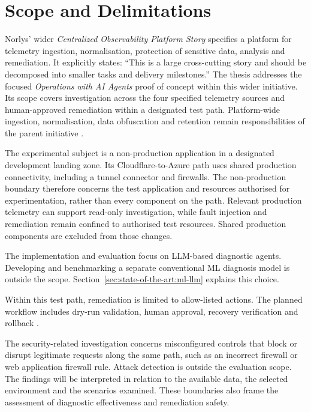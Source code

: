 \section{Scope and Delimitations}
\label{sec:introduction:scope}

Norlys' wider \emph{Centralized Observability Platform Story} specifies a
platform for telemetry ingestion, normalisation, protection of sensitive data,
analysis and remediation. It explicitly states:
\enquote{This is a large cross-cutting story and should be decomposed into
smaller tasks and delivery milestones.}
\parencite[Description]{norlys_observability_spec}
The thesis addresses the focused \emph{Operations with AI Agents} proof of
concept within this wider initiative. Its scope covers investigation across
the four specified telemetry sources and human-approved remediation within
a designated test path. Platform-wide ingestion, normalisation, data
obfuscation and retention remain responsibilities of the parent initiative
\parencite[Scope]{norlys_operations_agents}.

The experimental subject is a non-production application in a designated
development landing zone. Its Cloudflare-to-Azure path uses
shared production connectivity, including a tunnel connector and firewalls.
The non-production boundary therefore concerns the test application and
resources authorised for experimentation, rather than every component on
the path. Relevant production telemetry can support read-only investigation,
while fault injection and remediation remain confined to authorised test
resources. Shared production components are excluded from those changes.

The implementation and evaluation focus on LLM-based diagnostic agents.
Developing and benchmarking a separate conventional ML diagnosis model is
outside the scope. Section~\ref{sec:state-of-the-art:ml-llm} explains this choice.

Within this test path, remediation is limited to allow-listed actions.
The planned workflow includes dry-run validation, human approval, recovery
verification and rollback \parencite[AC-5]{norlys_operations_agents}.

The security-related investigation concerns misconfigured controls that
block or disrupt legitimate requests along the same path, such as an
incorrect firewall or web application firewall rule. Attack detection is
outside the evaluation scope. The findings will be interpreted in
relation to the available data, the selected environment and the scenarios
examined. These boundaries also frame the assessment of diagnostic
effectiveness and remediation safety.


